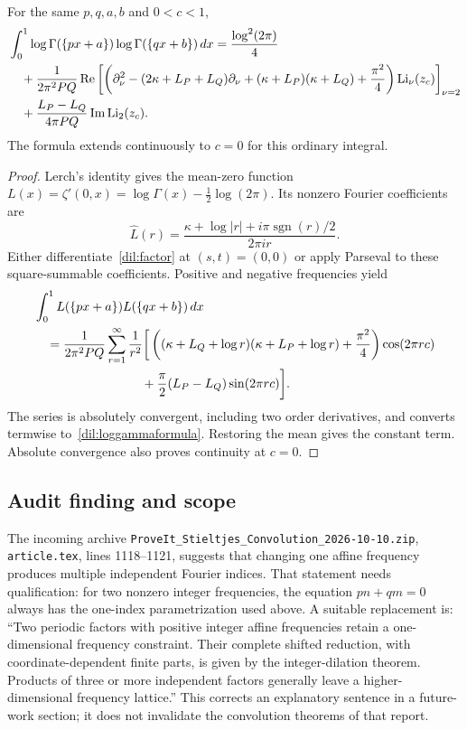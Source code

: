 \begin{corollary}
\label{dil:loggamma}
For the same $p,q,a,b$ and $0<c<1$,
\begin{align}
 &\int_0^1\log\Gamma(\{px+a\})\log\Gamma(\{qx+b\})\,dx
   =\frac{\log^2(2\pi)}4\notag\\
 &\quad+\frac1{2\pi^2PQ}\operatorname{Re}
  \left[\left(\partial_\nu^2-(2\kappa+L_P+L_Q)\partial_\nu
       +(\kappa+L_P)(\kappa+L_Q)+\frac{\pi^2}4\right)
           \operatorname{Li}_\nu(z_c)\right]_{\nu=2}\notag\\
 &\quad+\frac{L_P-L_Q}{4\pi PQ}
           \operatorname{Im}\operatorname{Li}_2(z_c).
 \label{dil:loggammaformula}
\end{align}
The formula extends continuously to $c=0$ for this ordinary integral.
\end{corollary}

\begin{proof}
Lerch's identity gives the mean-zero function
$L(x)=\zeta'(0,x)=\log\Gamma(x)-\tfrac12\log(2\pi)$. Its nonzero
Fourier coefficients are
\[
 \widehat L(r)=\frac{\kappa+\log|r|+i\pi\operatorname{sgn}(r)/2}
                       {2\pi i r}.
\]
Either differentiate~\eqref{dil:factor} at $(s,t)=(0,0)$ or apply
Parseval to these square-summable coefficients. Positive and negative
frequencies yield
\begin{align*}
 &\int_0^1L(\{px+a\})L(\{qx+b\})\,dx\\
 &\quad=\frac1{2\pi^2PQ}\sum_{r=1}^\infty\frac1{r^2}
 \bigg[\left((\kappa+L_Q+\log r)(\kappa+L_P+\log r)
          +\frac{\pi^2}4\right)\cos(2\pi rc)\\
 &\hspace{30mm}+\frac\pi2(L_P-L_Q)\sin(2\pi rc)\bigg].
\end{align*}
The series is absolutely convergent, including two order derivatives,
and converts termwise to~\eqref{dil:loggammaformula}. Restoring the mean
gives the constant term. Absolute convergence also proves continuity at
$c=0$.
\end{proof}

\subsection{Audit finding and scope}
The incoming archive \nolinkurl{ProveIt_Stieltjes_Convolution_2026-10-10.zip},
\texttt{article.tex}, lines 1118--1121, suggests that changing one affine
frequency produces multiple independent Fourier indices. That statement
needs qualification: for two nonzero integer frequencies, the equation
$pn+qm=0$ always has the one-index parametrization used above. A suitable
replacement is: ``Two periodic factors with positive integer affine
frequencies retain a one-dimensional frequency constraint. Their complete
shifted reduction, with coordinate-dependent finite parts, is given by
the integer-dilation theorem. Products of three or more independent
factors generally leave a higher-dimensional frequency lattice.'' This
corrects an explanatory sentence in a future-work section; it does not
invalidate the convolution theorems of that report.

